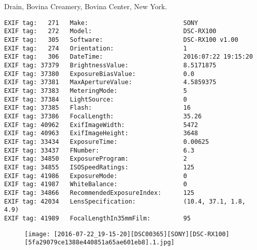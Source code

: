 \section{\protect{}}
\noindent Drain, Bovina Creamery, Bovina Center, New York.
\noindent
\begin{lstlisting}
EXIF tag:   271   Make:                          SONY
EXIF tag:   272   Model:                         DSC-RX100
EXIF tag:   305   Software:                      DSC-RX100 v1.00
EXIF tag:   274   Orientation:                   1
EXIF tag:   306   DateTime:                      2016:07:22 19:15:20
EXIF tag: 37379   BrightnessValue:               8.5171875
EXIF tag: 37380   ExposureBiasValue:             0.0
EXIF tag: 37381   MaxApertureValue:              4.5859375
EXIF tag: 37383   MeteringMode:                  5
EXIF tag: 37384   LightSource:                   0
EXIF tag: 37385   Flash:                         16
EXIF tag: 37386   FocalLength:                   35.26
EXIF tag: 40962   ExifImageWidth:                5472
EXIF tag: 40963   ExifImageHeight:               3648
EXIF tag: 33434   ExposureTime:                  0.00625
EXIF tag: 33437   FNumber:                       6.3
EXIF tag: 34850   ExposureProgram:               2
EXIF tag: 34855   ISOSpeedRatings:               125
EXIF tag: 41986   ExposureMode:                  0
EXIF tag: 41987   WhiteBalance:                  0
EXIF tag: 34866   RecommendedExposureIndex:      125
EXIF tag: 42034   LensSpecification:             (10.4, 37.1, 1.8, 4.9)
EXIF tag: 41989   FocalLengthIn35mmFilm:         95

\end{lstlisting}
\clearpage
\begin{figure}
\raggedleft
\texttt{[image: [2016-07-22\_19-15-20][DSC00365][SONY][DSC-RX100][5fa29079ce1388e440851a65ae601eb8].1.jpg]}
\end{figure}


\clearpage

